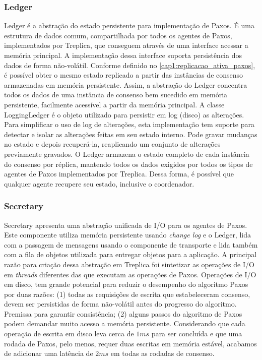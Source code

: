 \subsubsection{Ledger}

Ledger é a abstração do estado persistente para implementação de Paxos. É uma estrutura
de dados comum, compartilhada por todos os agentes de Paxos, implementados por Treplica,
que conseguem através de uma interface acessar a memória principal. A implementação dessa
interface suporta persistência dos dados de forma não-volátil. Conforme definido no
\autoref{cap1:replicacao_ativa_paxos}, é possível obter o mesmo estado replicado a partir
das instâncias de consenso armazenadas em memória persistente. Assim, a abstração do
Ledger concentra todos os dados de uma instância de consenso bem sucedido em memória
persistente, facilmente acessível a partir da memória principal. A classe LoggingLedger é
o objeto utilizado para persistir em log (disco) as alterações. Para simplificar o uso de
log de alterações, esta implementação tem suporte para detectar e isolar as alterações
feitas em seu estado interno. Pode gravar mudanças no estado e depois recuperá-la,
reaplicando um conjunto de alterações previamente gravados. O Ledger armazena o estado
completo de cada instância do consenso por réplica, mantendo todos os dados exigidos por
todos os tipos de agentes de Paxos implementados por Treplica. Dessa forma, é possível que
qualquer agente recupere seu estado, inclusive o coordenador.

\subsubsection{Secretary}\label{subsec:secretary}

Secretary apresenta uma abstração unificada de I/O para os agentes de Paxos. Este
componente utiliza memória persistente usando \emph{change log} e o Ledger, lida com a
passagem de mensagens usando o componente de transporte e lida também com a fila de
objetos utilizada para entregar objetos para a aplicação. A principal razão para criação
dessa abstração em Treplica foi sintetizar as operações de I/O em \emph{threads}
diferentes das que executam as operações de Paxos. Operações de I/O em disco, tem grande
potencial para reduzir o desempenho do algoritmo Paxos por duas razões: (1) todas as
requisições de escrita que estabeleceram consenso, devem ser persistidas de forma
não-volátil antes do progresso do algoritmo. Premissa para garantir consistência; (2)
alguns passos do algoritmo de Paxos podem demandar muito acesso a memória persistente.
Considerando que cada operação de escrita em disco leva cerca de $1ms$ para ser concluída
e que uma rodada de Paxos, pelo menos, requer duas escritas em memória estável, acabamos
de adicionar uma latência de $2ms$ em todas as rodadas de consenso.

